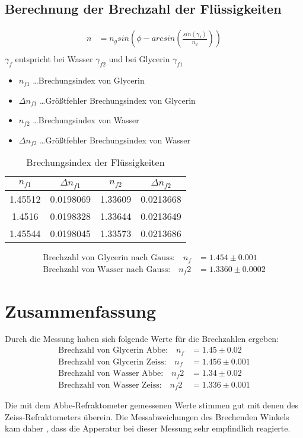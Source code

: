 \documentclass[a4paper]{article}
\begin{document}
\subsection{Berechnung der Brechzahl der Flüssigkeiten}
\begin{align}
  n &=n_g sin\left( \phi - arcsin\left(\frac{sin(\gamma_f)}{n_g}\right)\right)\\
\end{align}
$\gamma_f$ entspricht bei Wasser $\gamma_{f2}$ und bei Glycerin $\gamma_{f1}$
\begin{table}[ht]
  \centering
  \caption{Brechungsindex der Flüssigkeiten}
  \begin{itemize}
    \item $n_{f1}$ \dots Brechungsindex von Glycerin
    \item $\Delta n_{f1}$ \dots Größtfehler Brechungsindex von Glycerin
    \item $n_{f2}$ \dots  Brechungsindex von Wasser
    \item $\Delta n_{f2}$ \dots Größtfehler Brechungsindex von Wasser
  \end{itemize}
  \begin{tabular}{|c|c|c|c|}\hline
    $n_{f1}$&$\Delta n_{f1}$&$n_{f2}$&$\Delta n_{f2}$\\\hline
    1.45512 & 0.0198069 & 1.33609 & 0.0213668 \\\hline
    1.4516 & 0.0198328 & 1.33644 & 0.0213649 \\\hline
    1.45544 & 0.0198045 & 1.33573 & 0.0213686 \\\hline
  \end{tabular}
  \label{tab:flue}
\end{table}
\begin{align}
  \text{Brechzahl von Glycerin nach Gauss:}\quad n_f&=1.454\pm0.001\\
  \text{Brechzahl von Wasser nach Gauss:}\quad n_f2&=1.3360 \pm 0.0002	
\end{align}

\section{Zusammenfassung}
Durch die Messung haben sich folgende Werte für die Brechzahlen ergeben:
\begin{align}
  \text{Brechzahl von Glycerin Abbe:}\quad n_f&=1.45\pm0.02\\
  \text{Brechzahl von Glycerin Zeiss:}\quad n_f&=1.456\pm0.001\\
  \text{Brechzahl von Wasser Abbe:}\quad n_f2&=1.34 \pm 0.02	\\
  \text{Brechzahl von Wasser Zeiss:}\quad n_f2&=1.336 \pm 0.001	
\end{align}

Die mit dem Abbe-Refraktometer gemessenen Werte stimmen gut mit denen des Zeiss-Refraktometers überein. Die Messabweichungen des Brechenden Winkels kam daher , dass die Apperatur bei dieser Messung sehr empfindlich reagierte.
\end{document}

